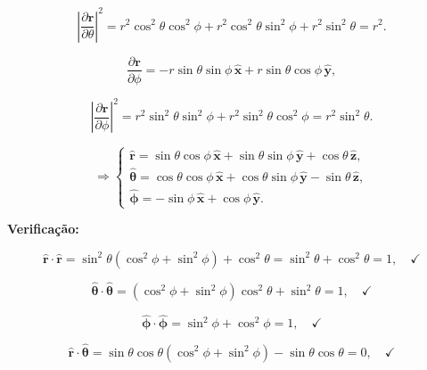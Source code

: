 \documentclass[a4paper,12pt]{article}
\begin{document}
\begin{equation}
\left| \frac{\partial \mathbf{r}}{\partial \theta} \right|^2 = r^2 \cos^2\theta \cos^2\phi + r^2 \cos^2\theta \sin^2\phi + r^2 \sin^2\theta = r^2.
\end{equation}

\begin{equation}
\frac{\partial \mathbf{r}}{\partial \phi} = -r \sin\theta \sin\phi \, \hat{\mathbf{x}} + r \sin\theta \cos\phi \, \hat{\mathbf{y}},
\end{equation}

\begin{equation}
\left| \frac{\partial \mathbf{r}}{\partial \phi} \right|^2 = r^2 \sin^2\theta \sin^2\phi + r^2 \sin^2\theta \cos^2\phi = r^2 \sin^2\theta.
\end{equation}

\begin{equation}\label{eq:r-theta-phi}
\Rightarrow
\begin{cases}
\hat{\mathbf{r}} = \sin\theta \cos\phi \, \hat{\mathbf{x}} + \sin\theta \sin\phi \, \hat{\mathbf{y}} + \cos\theta \, \hat{\mathbf{z}}, \\
\hat{\bm{\theta}} = \cos\theta \cos\phi \, \hat{\mathbf{x}} + \cos\theta \sin\phi \, \hat{\mathbf{y}} - \sin\theta \, \hat{\mathbf{z}}, \\
\hat{\bm{\phi}} = -\sin\phi \, \hat{\mathbf{x}} + \cos\phi \, \hat{\mathbf{y}}.
\end{cases}
\end{equation}

\textbf{Verificação:}

\begin{equation}
\hat{\mathbf{r}} \cdot \hat{\mathbf{r}} = \sin^2\theta (\cos^2\phi + \sin^2\phi) + \cos^2\theta = \sin^2\theta + \cos^2\theta = 1, \quad \checkmark
\end{equation}

\begin{equation}
\hat{\bm{\theta}} \cdot \hat{\bm{\theta}} = ( \cos^{2}\phi + \sin^{2}\phi)\cos^{2}\theta + \sin^{2}\theta = 1, \quad \checkmark
\end{equation}

\begin{equation}
\hat{\bm{\phi}} \cdot \hat{\bm{\phi}} =\sin^{2}\phi + \cos^{2}\phi = 1, \quad \checkmark
\end{equation}

\begin{equation}
\hat{\mathbf{r}} \cdot \hat{\bm{\theta}} = \sin\theta \cos\theta( \cos^{2}\phi + \sin^{2}\phi) - \sin\theta \cos\theta  = 0, \quad \checkmark
\end{equation}
\end{document}

